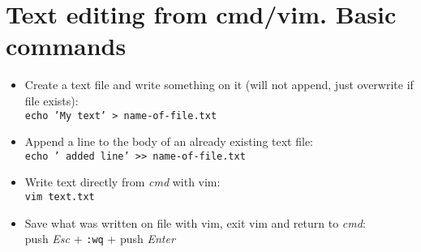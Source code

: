 \documentclass[12pt,a4paper]{scrartcl}
\begin{document}
\section{Text editing from cmd/vim. Basic commands}
\begin{itemize}   
    \item Create a text file and write something on it (will not append, just overwrite if file exists):\\
    	\texttt{echo 'My text' > name-of-file.txt}
    
    \item Append a line to the body of an already existing text file:\\
    	\texttt{echo ' added line' >> name-of-file.txt}
    
    \item Write text directly from \textit{cmd} with vim:\\
    	\texttt{vim text.txt}
    
    \item Save what was written on file with vim, exit vim and return to \textit{cmd}:\\
    	push \textit{Esc} + \texttt{:wq}   + push \textit{Enter}
\end{itemize}
\end{document}
